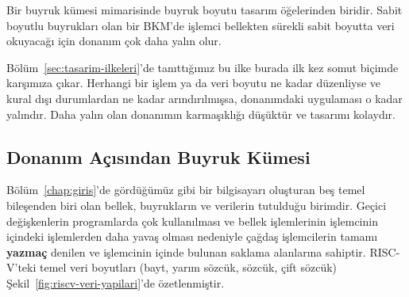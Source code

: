 Bir buyruk kümesi mimarisinde buyruk boyutu tasarım öğelerinden biridir. Sabit boyutlu buyrukları olan bir BKM'de işlemci bellekten sürekli sabit boyutta veri okuyacağı için donanım çok daha yalın olur.

\begin{tanim}
Bölüm~\ref{sec:tasarim-ilkeleri}'de tanıttığımız bu ilke burada ilk kez somut biçimde karşımıza çıkar. Herhangi bir işlem ya da veri boyutu ne kadar düzenliyse ve kural dışı durumlardan ne kadar arındırılmışsa, donanımdaki uygulaması o kadar yalındır. Daha yalın olan donanımın karmaşıklığı düşüktür ve tasarımı kolaydır.
\end{tanim}


\subsection{Donanım Açısından Buyruk Kümesi}

Bölüm~\ref{chap:giris}'de gördüğümüz gibi bir bilgisayarı oluşturan beş temel bileşenden biri olan bellek, buyrukların ve verilerin tutulduğu birimdir. Geçici değişkenlerin programlarda çok kullanılması ve bellek işlemlerinin işlemcinin içindeki işlemlerden daha yavaş olması nedeniyle çağdaş işlemcilerin tamamı \textbf{yazmaç} denilen ve işlemcinin içinde bulunan saklama alanlarına sahiptir. RISC-V'teki temel veri boyutları (bayt, yarım sözcük, sözcük, çift sözcük) Şekil~\ref{fig:riscv-veri-yapilari}'de özetlenmiştir.


